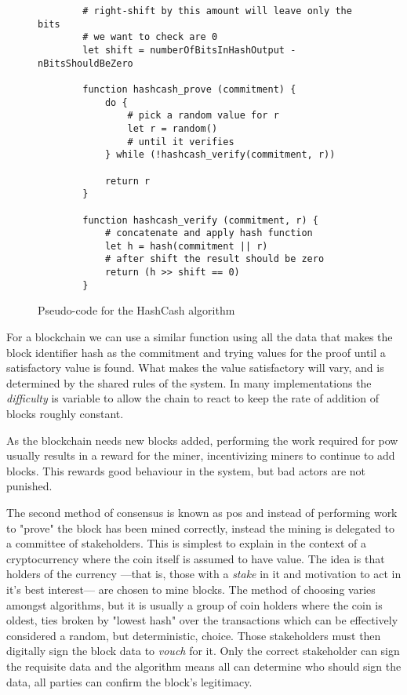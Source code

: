 \begin{figure}[h]
    \centering
    \begin{lstlisting}
        # right-shift by this amount will leave only the bits
        # we want to check are 0
        let shift = numberOfBitsInHashOutput - nBitsShouldBeZero

        function hashcash_prove (commitment) {
            do {
                # pick a random value for r
                let r = random()
                # until it verifies
            } while (!hashcash_verify(commitment, r))

            return r
        }

        function hashcash_verify (commitment, r) {
            # concatenate and apply hash function
            let h = hash(commitment || r)
            # after shift the result should be zero
            return (h >> shift == 0)
        }

        \end{lstlisting}
    \caption{Pseudo-code for the HashCash algorithm}
    \label{fig:hashcash}
\end{figure}

For a blockchain we can use a similar function using all the data that makes the block identifier hash as the commitment and trying values for the proof until a satisfactory value is found. What makes the value satisfactory will vary, and is determined by the shared rules of the system. In many implementations the \emph{difficulty} is variable to allow the chain to react to keep the rate of addition of blocks roughly constant.

As the blockchain needs new blocks added, performing the work required for \gls{pow} usually results in a reward for the miner, incentivizing miners to continue to add blocks. This rewards good behaviour in the system, but bad actors are not punished.

The second method of consensus is known as \gls{pos} and instead of performing work to "prove" the block has been mined correctly, instead the mining is delegated to a committee of stakeholders. This is simplest to explain in the context of a cryptocurrency where the coin itself is assumed to have value. The idea is that holders of the currency ---that is, those with a \emph{stake} in it and motivation to act in it's best interest--- are chosen to mine blocks. The method of choosing varies amongst algorithms, but it is usually a group of coin holders where the coin is oldest, ties broken by "lowest hash" over the transactions which can be effectively considered a random, but deterministic, choice. Those stakeholders must then digitally sign the block data to \emph{vouch} for it. Only the correct stakeholder can sign the requisite data and the algorithm means all can determine who should sign the data, all parties can confirm the block's legitimacy.

